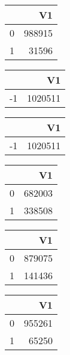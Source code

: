 \bigskip\bigskip
\centering
\begin{tabular}{rr}
  \hline
 & V1 \\ 
  \hline
0 & 988915 \\ 
  1 & 31596 \\ 
   \hline
\end{tabular}

\bigskip\bigskip
\centering
\begin{tabular}{rr}
  \hline
 & V1 \\ 
  \hline
-1 & 1020511 \\ 
   \hline
\end{tabular}

\bigskip\bigskip
\centering
\begin{tabular}{rr}
  \hline
 & V1 \\ 
  \hline
-1 & 1020511 \\ 
   \hline
\end{tabular}

\bigskip\bigskip
\centering
\begin{tabular}{rr}
  \hline
 & V1 \\ 
  \hline
0 & 682003 \\ 
  1 & 338508 \\ 
   \hline
\end{tabular}

\bigskip\bigskip
\centering
\begin{tabular}{rr}
  \hline
 & V1 \\ 
  \hline
0 & 879075 \\ 
  1 & 141436 \\ 
   \hline
\end{tabular}

\bigskip\bigskip
\centering
\begin{tabular}{rr}
  \hline
 & V1 \\ 
  \hline
0 & 955261 \\ 
  1 & 65250 \\ 
   \hline
\end{tabular}

